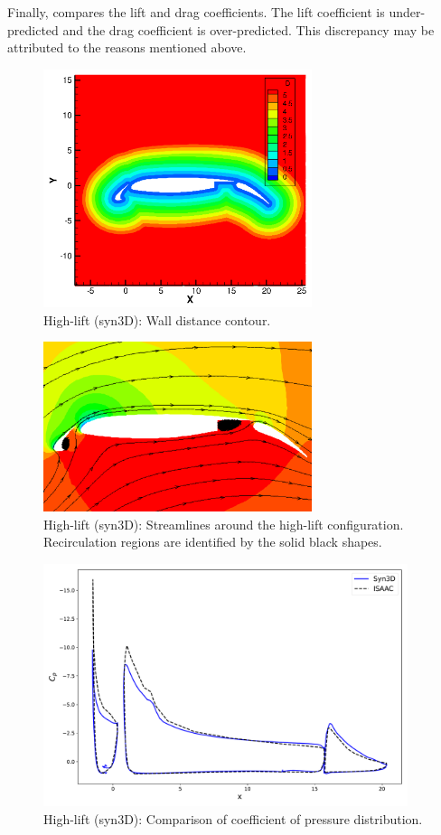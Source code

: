 Finally,  compares the lift and drag coefficients. The lift coefficient is under-predicted and the drag coefficient is over-predicted. This discrepancy may be attributed to the reasons mentioned above.
\begin{figure}
    \centering
    \includegraphics[width=0.7\textwidth]{figs/high/high_dist}
    \caption{High-lift (syn3D): Wall distance contour.}
    \label{fig:highdist}
\end{figure}
\begin{figure}
    \centering
    \includegraphics[width=0.7\textwidth]{figs/high/highstream}
    \caption{High-lift (syn3D): Streamlines around the high-lift configuration. Recirculation regions are identified by the solid black shapes.}
    \label{fig:highstream}
\end{figure}
\begin{figure}
    \centering
    \includegraphics[width=0.95\textwidth]{figs/high/cp_highlift}
    \caption{High-lift (syn3D): Comparison of coefficient of pressure distribution.}
    \label{fig:highcp}
\end{figure}
